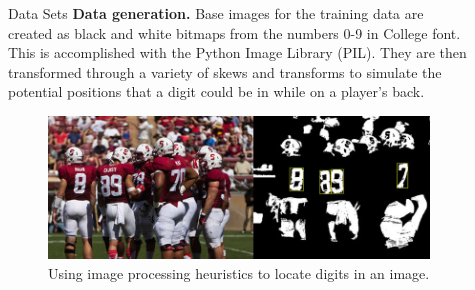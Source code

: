 \documentclass[final]{beamer}
\newlength{\sepwid}
\newlength{\onecolwid}
\newlength{\twocolwid}
\begin{document}
\begin{frame}[t]
\begin{columns}[t]
\begin{column}{\onecolwid}
\begin{block}{Data Sets}
{\bf Data generation.} Base images for the training data are created as black and white bitmaps from the numbers 0-9 in College font. This is accomplished with the Python Image Library (PIL). They are then transformed through a variety of skews and transforms to simulate the potential positions that a digit could be in while on a player's back. 

\end{block}


\begin{figure}
\includegraphics[width=0.8\linewidth]{recognition.jpg}
\caption{Using image processing heuristics to locate digits in an image.}
\end{figure}


\end{column} %

\begin{column}{\sepwid}\end{column} %

\begin{column}{\twocolwid} %

\begin{columns}[t,totalwidth=\twocolwid] %

\begin{column}{\onecolwid}\vspace{-.6in} %



\end{column}
\end{columns}
\end{column}
\end{columns}
\end{frame}
\end{document}
